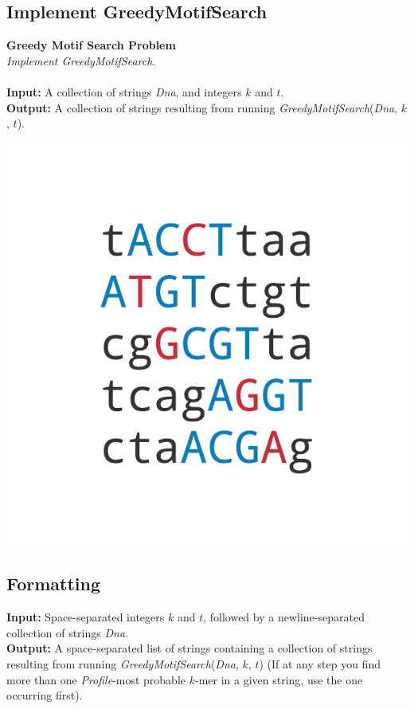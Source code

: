 \documentclass{article}
\begin{document}
\subsection{Implement GreedyMotifSearch}
\hline\vspace{5}
\noindent\textbf{Greedy Motif Search Problem}\\
\emph{Implement GreedyMotifSearch}.\\ \\
\textbf{Input:} A collection of strings \emph{Dna}, and integers $k$ and $t$.\\
\textbf{Output:} A collection of strings resulting from running \emph{GreedyMotifSearch}(\emph{Dna}, $k$, $t$).
\begin{center}
    \includegraphics[scale=0.2]{c2/logos/2D.png} 
\end{center}
\hline\vspace{5}

\subsection*{Formatting}
\textbf{Input:} Space-separated integers $k$ and $t$, followed by a newline-separated collection of strings \emph{Dna}.\\
\noindent\textbf{Output:} A space-separated list of strings containing a collection of strings resulting from running \emph{GreedyMotifSearch}(\emph{Dna}, $k$, $t$) (If at any step you find more than one \emph{Profile}-most probable $k$-mer in a given string, use the one occurring first).
\end{document}
